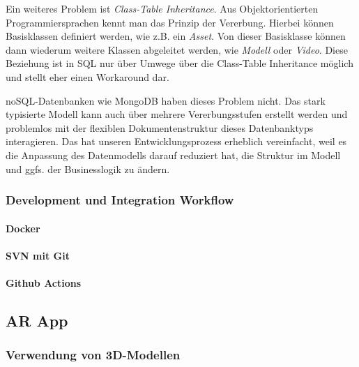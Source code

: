 \documentclass[titlepage, a4paper, 11pt]{scrartcl}
\begin{document}
          Ein weiteres Problem ist \textit{Class-Table Inheritance}. Aus Objektorientierten Programmiersprachen kennt man das Prinzip der Vererbung. 
          Hierbei können Basisklassen definiert werden, wie z.B. ein \textit{Asset}. Von dieser Basisklasse können dann wiederum weitere Klassen abgeleitet werden, 
          wie \textit{Modell} oder \textit{Video}. Diese Beziehung ist in SQL nur über Umwege über die Class-Table Inheritance möglich und stellt eher einen Workaround dar.

          noSQL-Datenbanken wie MongoDB haben dieses Problem nicht. Das stark typisierte Modell kann auch über mehrere Vererbungsstufen erstellt werden und problemlos
          mit der flexiblen Dokumentenstruktur dieses Datenbanktyps interagieren. Das hat unseren Entwicklungsprozess erheblich vereinfacht, weil es die Anpassung 
          des Datenmodells darauf reduziert hat, die Struktur im Modell und ggfs. der Businesslogik zu ändern.

      \subsubsection{Development und Integration Workflow}

        \paragraph{Docker}

        \paragraph{SVN mit Git}

        \paragraph{Github Actions}


    \subsection{AR App}

    \subsubsection{Verwendung von 3D-Modellen}
    
\end{document}
